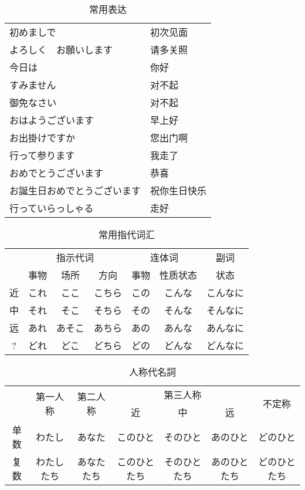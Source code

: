 \begin{table}[h]
  \centering
  \caption{常用表达}
  \label{tab:label}
  \small
  \begin{tabular}{ll}
    初めましで & 初次见面 \\
    よろしく　お願いします & 请多关照 \\
    今日は & 你好 \\
    すみません & 对不起 \\
    御免なさい & 对不起 \\
    おはようございます & 早上好 \\
    お出掛けですか & 您出门啊 \\
    行って参ります & 我走了 \\
    おめでとうございます & 恭喜 \\
    お誕生日おめでとうございます & 祝你生日快乐 \\
    行っていらっしゃる & 走好 \\
  \end{tabular}
\end{table}

\begin{table}[h]
  \centering
  \caption{常用指代词汇}
  \label{tab:label}
  \small
  \begin{tabular}{c|ccc|cc|c}
    & \multicolumn{3}{c|}{指示代词} & \multicolumn{2}{c|}{连体词} & 副词 \\
    & 事物 & 场所 & 方向 & 事物 & 性质状态 & 状态 \\
    \hline
    近 & これ & ここ   & こちら & この & こんな & こんなに \\
    中 & それ & そこ   & そちら & その & そんな & そんなに \\
    远 & あれ & あそこ & あちら & あの & あんな & あんなに \\
    ?  & どれ & どこ   & どちら & どの & どんな & どんなに \\
  \end{tabular}
\end{table}

\begin{table}[h]
  \centering
  \caption{人称代名詞}
  \label{tab:label}
  \small
  \begin{tabular}{c|c|c|ccc|c}
    & \multirow{2}{*}{第一人称} & \multirow{2}{*}{第二人称} & \multicolumn{3}{c|}{第三人称} & \multirow{2}{*}{不定称} \\
    & & & 近 & 中 & 远 & \\
    \hline
    单数 & わたし & あなた & このひと & そのひと & あのひと & どのひと \\
    复数 &わたしたち & あなたたち & このひとたち & そのひとたち & あのひとたち & どのひとたち \\
  \end{tabular}
\end{table}

